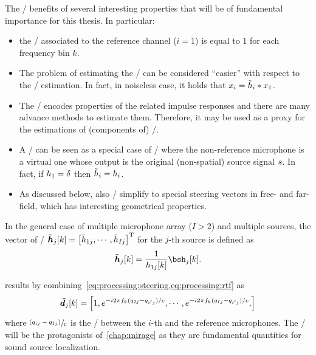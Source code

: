 The \RTFs/ benefits of several interesting properties that will be of fundamental importance for this thesis.
In particular:
\begin{itemize}
    \item the \RTF/ associated to the reference channel ($i = 1$) is equal to $1$ for each frequency bin $k$.
    \item The problem of estimating the \RTF/ can be considered ``easier'' with respect to the \RIRs/ estimation.
    In fact, in noiseless case, it holds that $x_i = \tilde{h}_i \ast x_1$.
    \item The \RTF/ encodes properties of the related impulse responses and there are many advance methods to estimate them.
    Therefore, it may be used as a proxy for the estimations of (components of) \RIRs/.
    \item A \RIR/ can be seen as a special case of \RTF/ where the non-reference microphone is a virtual one whose
    output is the original (non-spatial) source signal $s$. In fact, if $h_1 = \delta$ then $\tilde{h}_i = h_i$.
    \item As discussed below, also \RTFs/ simplify to special steering vectors in free- and far-field, which has interesting
    geometrical properties.
\end{itemize}

In the general case of multiple microphone array ($I>2$) and multiple sources, the vector of \RTFs/ $\rtfs_j[k] = \ktranspose{\klist{\rtf_ {1j}, \cdots, \rtf_{Ij}}}$
for the $j$-th source is defined as
\begin{equation}\label{eq:processing:rtf}
    \rtfs_j[k] = \frac{1}{\rir_{1j}[k]} \rirs_j[k]
    .
\end{equation}


 results by combining~\cref{eq:processing:steering,eq:processing:rtf} as
\begin{equation}
    \boldsymbol{\tilde{d}}_{j}[k] = \klist{
                         1,
                         \cste^{-\csti 2 \pi f_k (\distMicSrc_{2j}-\distMicSrc_{i'j}) / \speedOfSound},
                         \cdots,
                         \cste^{-\csti 2 \pi f_k (\distMicSrc_{Ij}-\distMicSrc_{i'j}) / \speedOfSound},
                    }
\end{equation}
where $\sfrac{(q_{ij}-q_{1j})}{c}$ is the \TDOA/ between the $i$-th and the reference microphones.
The \TDOAs/ will be the protagonists of~\cref{chap:mirage} as they are fundamental quantities for sound source localization.

